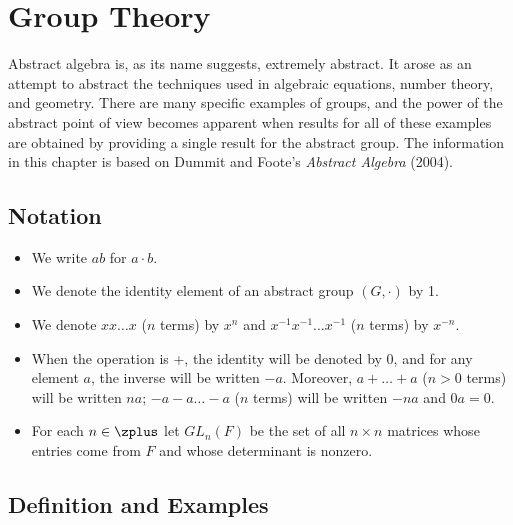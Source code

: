 \chapter{Group Theory}

Abstract algebra is, as its name suggests, extremely abstract. It 
arose as an attempt to abstract the techniques used in algebraic 
equations, number theory, and geometry.
There are many specific examples of groups, and the power of the 
abstract point of view becomes apparent when results for all of 
these examples are obtained by providing a single result for the 
abstract group. The information in this chapter is based on Dummit 
and Foote's \emph{Abstract Algebra} (2004).


\newpage

\section{Notation}

\begin{itemize}
	\item We write $ab$ for $a \cdot b$.
	
	\item We denote the identity element of an abstract group $(G, 
	\cdot)$ by 1.
	
	\item We denote $xx \dots x$ ($n$ terms) by $x^n$ and $x^{-1} 
	x^{-1} \dots x^{-1}$ ($n$ terms) by $x^{-n}$.
	
	\item When the operation is +, the identity will be denoted by 
	0, and for any element $a$, the inverse will be written $-a$. 
	Moreover, $a+ \dots + a$ ($n > 0$ terms) will be written $na$; 
	$-a - a \dots -a$ ($n$ terms) will be written $-na$ and $0a = 
	0$.
	
	\item For each $n \in \zplus$ let $GL_n(F)$ be the set of all 
	$n \times n$ matrices whose entries come from $F$ and whose 
	determinant is nonzero.
\end{itemize}


\newpage

\section{Definition and Examples}

